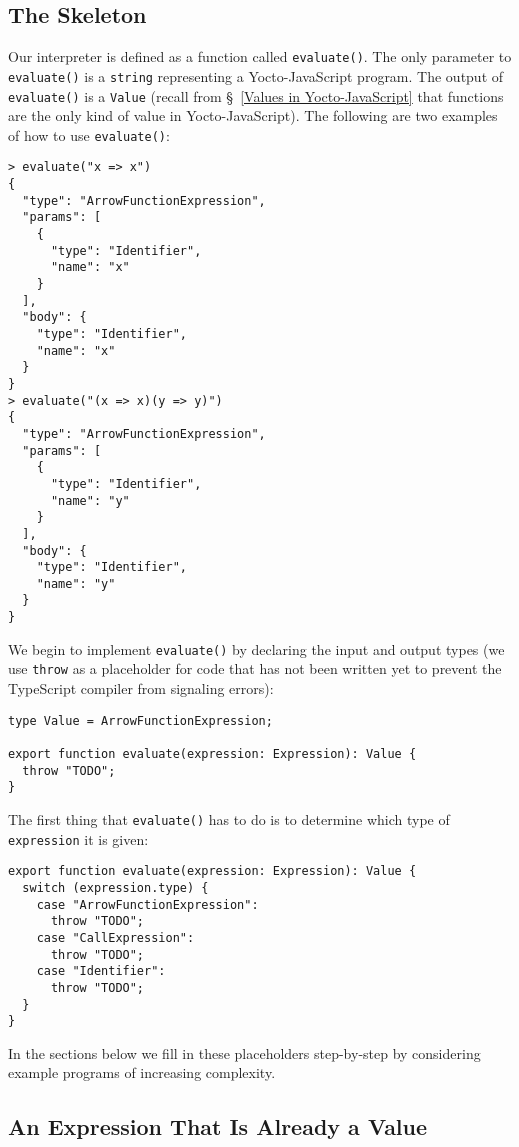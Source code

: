 \documentclass[12pt, oneside]{book}
\begin{document}
\subsection{The Skeleton}

Our interpreter is defined as a function called \texttt{evaluate()}. The only parameter to \texttt{evaluate()} is a \texttt{string} representing a Yocto-JavaScript program. The output of \texttt{evaluate()} is a \texttt{Value} (recall from §~\ref{Values in Yocto-JavaScript} that functions are the only kind of value in Yocto-JavaScript). The following are two examples of how to use \texttt{evaluate()}:

\begin{verbatim}
> evaluate("x => x")
{
  "type": "ArrowFunctionExpression",
  "params": [
    {
      "type": "Identifier",
      "name": "x"
    }
  ],
  "body": {
    "type": "Identifier",
    "name": "x"
  }
}
> evaluate("(x => x)(y => y)")
{
  "type": "ArrowFunctionExpression",
  "params": [
    {
      "type": "Identifier",
      "name": "y"
    }
  ],
  "body": {
    "type": "Identifier",
    "name": "y"
  }
}
\end{verbatim}

We begin to implement \texttt{evaluate()} by declaring the input and output types (we use \texttt{throw} as a placeholder for code that has not been written yet to prevent the TypeScript compiler from signaling errors):

\begin{verbatim}
type Value = ArrowFunctionExpression;

export function evaluate(expression: Expression): Value {
  throw "TODO";
}
\end{verbatim}

The first thing that \texttt{evaluate()} has to do is to determine which type of \texttt{expression} it is given:

\begin{verbatim}
export function evaluate(expression: Expression): Value {
  switch (expression.type) {
    case "ArrowFunctionExpression":
      throw "TODO";
    case "CallExpression":
      throw "TODO";
    case "Identifier":
      throw "TODO";
  }
}
\end{verbatim}

In the sections below we fill in these placeholders step-by-step by considering example programs of increasing complexity.

\subsection{An Expression That Is Already a Value}
\end{document}
